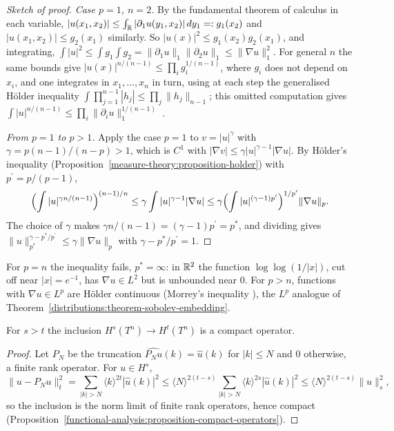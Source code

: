 \begin{proof}[Sketch of proof]
\emph{Case $p = 1$, $n = 2$.} By the fundamental theorem of calculus in each variable, $|u(x_1, x_2)| \leq \int_{\mathbb{R}}|\partial_1u(y_1, x_2)|\,dy_1 =: g_1(x_2)$ and $|u(x_1, x_2)| \leq g_2(x_1)$ similarly. So
$|u(x)|^2 \leq g_1(x_2)g_2(x_1)$, and integrating, $\int|u|^2 \leq \int g_1\int g_2 = \|\partial_1u\|_1\|\partial_2u\|_1 \leq \|\nabla u\|_1^2$. For general $n$ the same bounds give
$|u(x)|^{n/(n-1)} \leq \prod_i g_i^{1/(n-1)}$, where $g_i$ does not depend on $x_i$, and one integrates in $x_1, \ldots, x_n$ in turn, using at each step the generalised H\"older inequality
$\int\prod_{j=1}^{n-1}|h_j| \leq \prod_j\|h_j\|_{n-1}$; this omitted computation gives $\int|u|^{n/(n-1)} \leq \prod_i\|\partial_iu\|_1^{1/(n-1)}$ \cite[Chapter 9]{brezis-functional}.

\emph{From $p = 1$ to $p > 1$.} Apply the case $p = 1$ to $v = |u|^\gamma$ with $\gamma = p(n - 1)/(n - p) > 1$, which is $C^1$ with $|\nabla v| \leq \gamma|u|^{\gamma - 1}|\nabla u|$. By H\"older's inequality
(Proposition~\ref{measure-theory:proposition-holder}) with $p^{\prime} = p/(p - 1)$,
\[
\Bigl(\int|u|^{\gamma n/(n-1)}\Bigr)^{(n-1)/n} \leq \gamma\int|u|^{\gamma - 1}|\nabla u| \leq \gamma\Bigl(\int|u|^{(\gamma - 1)p^{\prime}}\Bigr)^{1/p^{\prime}}\|\nabla u\|_p .
\]
The choice of $\gamma$ makes $\gamma n/(n - 1) = (\gamma - 1)p^{\prime} = p^*$, and dividing gives $\|u\|_{p^*}^{\gamma - p^*/p^{\prime}} \leq \gamma\|\nabla u\|_p$ with $\gamma - p^*/p^{\prime} = 1$.
\end{proof}

For $p = n$ the inequality fails, $p^* = \infty$: in $\mathbb{R}^2$ the function $\log\log(1/|x|)$, cut off near $|x| = e^{-1}$, has $\nabla u \in L^2$ but is unbounded near $0$. For $p > n$, functions with
$\nabla u \in L^p$ are H\"older continuous (Morrey's inequality \cite[Chapter 9]{brezis-functional}), the $L^p$ analogue of Theorem~\ref{distributions:theorem-sobolev-embedding}.

\begin{theorem}[Rellich]\label{distributions:theorem-rellich}
For $s > t$ the inclusion $H^s(T^n) \to H^t(T^n)$ is a compact operator.
\end{theorem}

\begin{proof}
Let $P_N$ be the truncation $\widehat{P_Nu}(k) = \hat u(k)$ for $|k| \leq N$ and $0$ otherwise, a finite rank operator. For $u \in H^s$,
\[
\|u - P_Nu\|_t^2 = \sum_{|k| > N}\langle k\rangle^{2t}|\hat u(k)|^2 \leq \langle N\rangle^{2(t-s)}\sum_{|k| > N}\langle k\rangle^{2s}|\hat u(k)|^2 \leq \langle N\rangle^{2(t-s)}\|u\|_s^2,
\]
so the inclusion is the norm limit of finite rank operators, hence compact (Proposition~\ref{functional-analysis:proposition-compact-operators}).
\end{proof}

